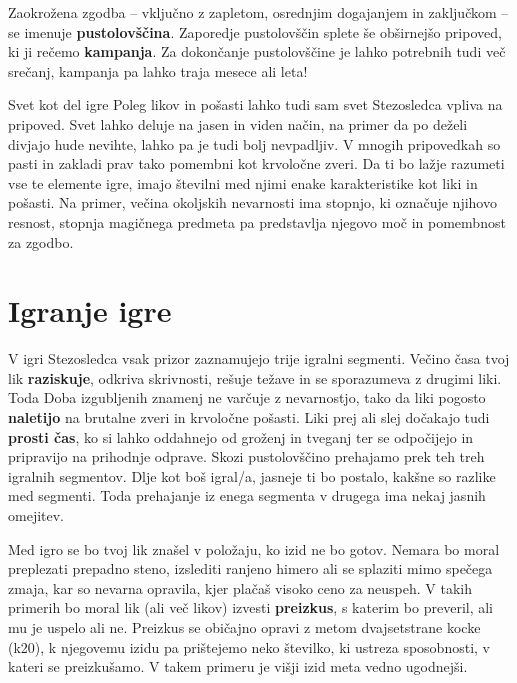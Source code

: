 Zaokrožena zgodba -- vključno z zapletom, osrednjim dogajanjem in zaključkom -- se imenuje \textbf{pustolovščina}. Zaporedje pustolovščin splete še obširnejšo pripoved, ki ji rečemo \textbf{kampanja}. Za dokončanje pustolovščine je lahko potrebnih tudi več srečanj, kampanja pa lahko traja mesece ali leta!

\begin{rpg-titlebox}{Svet kot del igre}
    Poleg likov in pošasti lahko tudi sam svet Stezosledca vpliva na pripoved. Svet lahko deluje na jasen in viden način, na primer da po deželi divjajo hude nevihte, lahko pa je tudi bolj nevpadljiv. V mnogih pripovedkah so pasti in zakladi prav tako pomembni kot krvoločne zveri. Da ti bo lažje razumeti vse te elemente igre, imajo številni med njimi enake karakteristike kot liki in pošasti. Na primer, večina okoljskih nevarnosti ima stopnjo, ki označuje njihovo resnost, stopnja magičnega predmeta pa predstavlja njegovo moč in pomembnost za zgodbo.
\end{rpg-titlebox}

\section{Igranje igre}

V igri Stezosledca vsak prizor zaznamujejo trije igralni segmenti. Večino časa tvoj lik \textbf{raziskuje}, odkriva skrivnosti, rešuje težave in se sporazumeva z drugimi liki. Toda Doba izgubljenih znamenj ne varčuje z nevarnostjo, tako da liki pogosto \textbf{naletijo} na brutalne zveri in krvoločne pošasti. Liki prej ali slej dočakajo tudi \textbf{prosti čas}, ko si lahko oddahnejo od groženj in tveganj ter se odpočijejo in pripravijo na prihodnje odprave. Skozi pustolovščino prehajamo prek teh treh igralnih segmentov. Dlje kot boš igral/a, jasneje ti bo postalo, kakšne so razlike med segmenti. Toda prehajanje iz enega segmenta v drugega ima nekaj jasnih omejitev.

Med igro se bo tvoj lik znašel v položaju, ko izid ne bo gotov. Nemara bo moral preplezati prepadno steno, izslediti ranjeno himero ali se splaziti mimo spečega zmaja, kar so nevarna opravila, kjer plačaš visoko ceno za neuspeh. V takih primerih bo moral lik (ali več likov) izvesti \textbf{preizkus}, s katerim bo preveril, ali mu je uspelo ali ne. Preizkus se običajno opravi z metom dvajsetstrane kocke (k20), k njegovemu izidu pa prištejemo neko številko, ki ustreza sposobnosti, v kateri se preizkušamo. V takem primeru je višji izid meta vedno ugodnejši.

